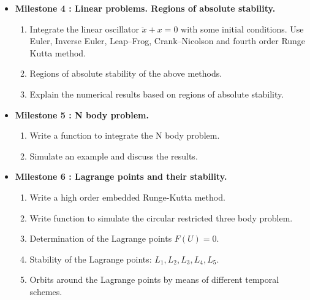 \documentclass[12pt, a4paper]{article}
\begin{document}
\begin{itemize}
\begin{enumerate}
\end{enumerate} 


\newpage
\item {\bf Milestone 4 : Linear problems. Regions of absolute stability.}  
  \begin{enumerate}
\item  Integrate the linear oscillator $ \ddot x+ x =0$ with some initial conditions.  
       Use Euler, Inverse Euler, Leap--Frog, Crank--Nicolson and fourth order Runge Kutta
        method.  
\item Regions of absolute stability of the above methods. 
\item Explain the numerical results based on regions of absolute stability.
\end{enumerate}
 

\item {\bf Milestone 5 : N  body problem.}    

 \begin{enumerate} 
    
     \item Write a function to integrate the N body problem.  
     \item Simulate an example and discuss the results. 
 \end{enumerate}



\item {\bf Milestone 6 : Lagrange points and their stability. }                                                      




\begin{enumerate}
\item Write a high order embedded Runge-Kutta method. 
\item Write function to simulate  the  circular restricted three body 
problem.
\item Determination of the Lagrange points $ F(U) = 0$. 
\item Stability of the Lagrange points: $ L_1, L_2 ,L_3,  L_4, L_5 $.
\item Orbits around the Lagrange points by means of different temporal schemes.

 \end{enumerate}
 
 


\end{itemize}
\end{document}
